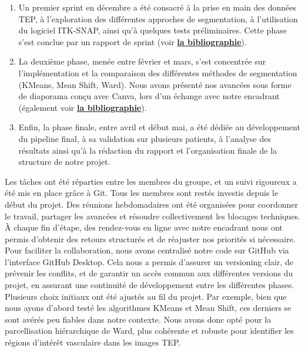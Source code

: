\documentclass[a4paper]{article}
\begin{document}
    \begin{enumerate}
        \item Un premier sprint en décembre a été consacré à la prise en main des données TEP, à l’exploration des différentes approches de segmentation, à l’utilisation du logiciel ITK-SNAP, ainsi qu’à quelques tests préliminaires. Cette phase s’est conclue par un rapport de sprint (voir \hyperref[bibliographie]{\textbf{la bibliographie}}).
        \item La deuxième phase, menée entre février et mars, s’est concentrée sur l’implémentation et la comparaison des différentes méthodes de segmentation (KMeans, Mean Shift, Ward). Nous avons présenté nos avancées sous forme de diaporama conçu avec Canva, lors d’un échange avec notre encadrant (également voir \hyperref[bibliographie]{\textbf{la bibliographie}}).
        \item Enfin, la phase finale, entre avril et début mai, a été dédiée au développement du pipeline final, à sa validation sur plusieurs patients, à l'analyse des résultats ainsi qu’à la rédaction du rapport et l'organisation finale de la structure de notre projet.
    \end{enumerate}
    
    \noindent
    Les tâches ont été réparties entre les membres du groupe, et un suivi rigoureux a été mis en place grâce à Git. Tous les membres sont restés investis depuis le début du projet. Des réunions hebdomadaires ont été organisées pour coordonner le travail, partager les avancées et résoudre collectivement les blocages techniques. À chaque fin d’étape, des rendez-vous en ligne avec notre encadrant nous ont permis d’obtenir des retours structurés et de réajuster nos priorités si nécessaire.\\
    
    \noindent
    Pour faciliter la collaboration, nous avons centralisé notre code sur GitHub via l’interface GitHub Desktop. Cela nous a permis d’assurer un versioning clair, de prévenir les conflits, et de garantir un accès commun aux différentes versions du projet, en assurant une continuité de développement entre les différentes phases.\\
    
    \noindent
    Plusieurs choix initiaux ont été ajustés au fil du projet. Par exemple, bien que nous ayons d’abord testé les algorithmes KMeans et Mean Shift, ces derniers se sont avérés peu fiables dans notre contexte. Nous avons donc opté pour la parcellisation hiérarchique de Ward, plus cohérente et robuste pour identifier les régions d’intérêt vasculaire dans les images TEP.\\
    
\end{document}
